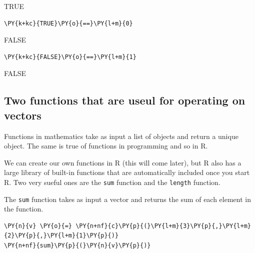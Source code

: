     TRUE

    
    \begin{tcolorbox}[breakable, size=fbox, boxrule=1pt, pad at break*=1mm,colback=cellbackground, colframe=cellborder]
\begin{Verbatim}[commandchars=\\\{\}]
\PY{k+kc}{TRUE}\PY{o}{==}\PY{l+m}{0}
\end{Verbatim}
\end{tcolorbox}

    FALSE

    
    \begin{tcolorbox}[breakable, size=fbox, boxrule=1pt, pad at break*=1mm,colback=cellbackground, colframe=cellborder]
\begin{Verbatim}[commandchars=\\\{\}]
\PY{k+kc}{FALSE}\PY{o}{==}\PY{l+m}{1}
\end{Verbatim}
\end{tcolorbox}

    FALSE

    
    \hypertarget{two-functions-that-are-useul-for-operating-on-vectors}{%
\subsection{Two functions that are useul for operating on
vectors}\label{two-functions-that-are-useul-for-operating-on-vectors}}

Functions in mathematics take as input a list of objects and return a
unique object. The same is true of functions in programming and so in R.

We can create our own functions in R (this will come later), but R also
has a large library of built-in functions that are automatically
included once you start R. Two very sueful ones are the \texttt{sum}
function and the \texttt{length} function.

The \texttt{sum} function takes as input a vector and returns the sum of
each element in the function.

    \begin{tcolorbox}[breakable, size=fbox, boxrule=1pt, pad at break*=1mm,colback=cellbackground, colframe=cellborder]
\begin{Verbatim}[commandchars=\\\{\}]
\PY{n}{v} \PY{o}{=} \PY{n+nf}{c}\PY{p}{(}\PY{l+m}{3}\PY{p}{,}\PY{l+m}{2}\PY{p}{,}\PY{l+m}{1}\PY{p}{)}
\PY{n+nf}{sum}\PY{p}{(}\PY{n}{v}\PY{p}{)}
\end{Verbatim}
\end{tcolorbox}

